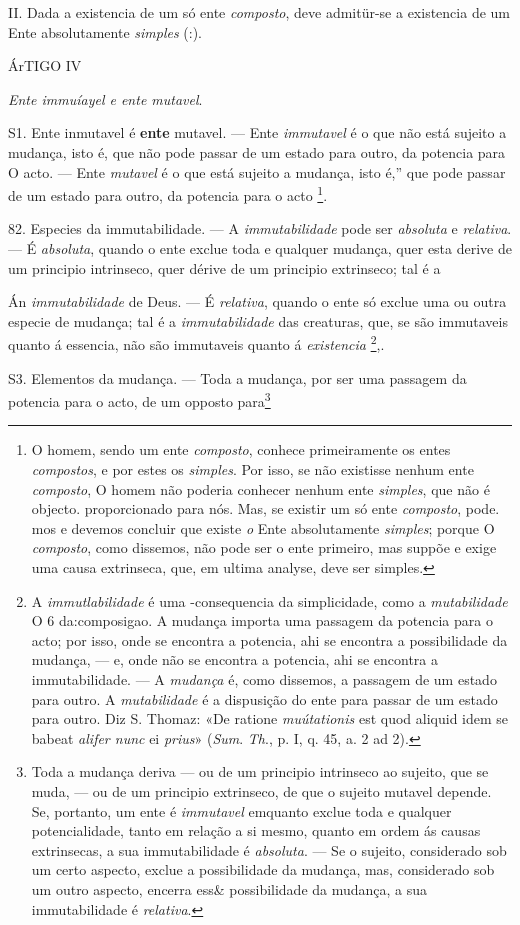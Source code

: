  II. Dada a existencia de um só ente \emph{composto}, deve admitür-se a existencia de um Ente absolutamente \emph{simples} (:).

ÁrTIGO IV

\emph{Ente immuíayel e ente mutavel}.

S1. Ente inmutavel é \textbf{ente} mutavel. --- Ente \emph{immutavel} é o que não está sujeito a mudança, isto é, que não pode passar de um estado para outro, da potencia para O acto. --- Ente \emph{mutavel} é o que está sujeito a mudança, isto é,” que pode passar de um estado para outro, da potencia para o acto \footnote{O homem, sendo um ente \emph{composto}, conhece primeiramente os entes \emph{compostos}, e por estes os \emph{simples}. Por isso, se não existisse nenhum ente \emph{composto}, O homem não poderia conhecer nenhum ente \emph{simples}, que não é objecto. proporcionado para nós. Mas, se existir um só ente \emph{composto}, pode. mos e devemos concluir que existe \emph{o} Ente absolutamente \emph{simples}; porque O \emph{composto}, como dissemos, não pode ser o ente primeiro, mas suppõe e exige uma causa extrinseca, que, em ultima analyse, deve ser simples.}.

82. Especies da immutabilidade. --- A \emph{immutabilidade} pode ser \emph{absoluta} e \emph{relativa}. --- É \emph{absoluta}, quando o ente exclue toda e qualquer mudança, quer esta derive de um principio intrinseco, quer dérive de um principio extrinseco; tal é a

Án \emph{immutabilidade} de Deus. --- É \emph{relativa}, quando o ente só exclue uma ou outra especie de mudança; tal é a \emph{immutabilidade} das creaturas, que, se são immutaveis quanto á essencia, não são immutaveis quanto á \emph{existencia} \footnote{A \emph{immutlabilidade} é uma -consequencia da simplicidade, como a \emph{mutabilidade} O 6 da:composigao. A mudança importa uma passagem da potencia para o acto; por isso, onde se encontra a potencia, ahi se encontra a possibilidade da mudança, --- e, onde não se encontra a potencia, ahi se encontra a immutabilidade. --- A \emph{mudança} é, como dissemos, a passagem de um estado para outro. A \emph{mutabilidade} é a dispusição do ente para passar de um estado para outro. Diz S. Thomaz: «De ratione \emph{muútationis} est quod aliquid idem se babeat \emph{alifer nunc} ei \emph{prius}» (\emph{Sum}. \emph{Th}., p. I, q. 45, a. 2 ad 2).},.

S3. Elementos da mudança. --- Toda a mudança, por ser uma passagem da potencia para o acto, de um opposto para\footnote{Toda a mudança deriva --- ou de um principio intrinseco ao sujeito, que se muda, --- ou de um principio extrinseco, de que o sujeito mutavel depende. Se, portanto, um ente é \emph{immutavel} emquanto exclue toda e qualquer potencialidade, tanto em relação a si mesmo, quanto em ordem ás causas extrinsecas, a sua immutabilidade é \emph{absoluta}. --- Se o sujeito, considerado sob um certo aspecto, exclue a possibilidade da mudança, mas, considerado sob um outro aspecto, encerra ess\& possibilidade da mudança, a sua immutabilidade é \emph{relativa}.} 